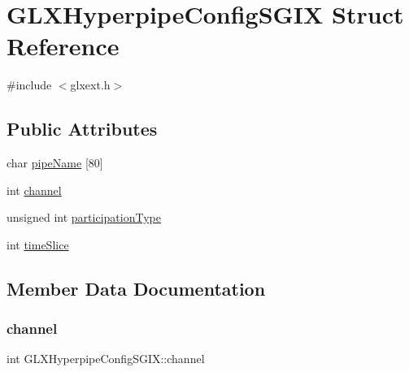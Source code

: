 \hypertarget{struct_g_l_x_hyperpipe_config_s_g_i_x}{}\section{G\+L\+X\+Hyperpipe\+Config\+S\+G\+IX Struct Reference}
\label{struct_g_l_x_hyperpipe_config_s_g_i_x}


{\ttfamily \#include $<$glxext.\+h$>$}

\subsection*{Public Attributes}
\begin{DoxyCompactItemize}
\item 
char \hyperlink{struct_g_l_x_hyperpipe_config_s_g_i_x_adbbd59b9e05c106f38f6fe769653be86}{pipe\+Name} \mbox{[}80\mbox{]}
\item 
int \hyperlink{struct_g_l_x_hyperpipe_config_s_g_i_x_abc812d8796ba89d5de4e33b3532d8335}{channel}
\item 
unsigned int \hyperlink{struct_g_l_x_hyperpipe_config_s_g_i_x_a093cfaaec305531f66e1120929b5b01b}{participation\+Type}
\item 
int \hyperlink{struct_g_l_x_hyperpipe_config_s_g_i_x_afe9288e75dc1ae5e0f33eff978d7024d}{time\+Slice}
\end{DoxyCompactItemize}


\subsection{Member Data Documentation}
\mbox{\label{struct_g_l_x_hyperpipe_config_s_g_i_x_abc812d8796ba89d5de4e33b3532d8335}} 
\subsubsection{\texorpdfstring{channel}{channel}}
{\footnotesize\ttfamily int G\+L\+X\+Hyperpipe\+Config\+S\+G\+I\+X\+::channel}

\mbox{\label{struct_g_l_x_hyperpipe_config_s_g_i_x_a093cfaaec305531f66e1120929b5b01b}} 
